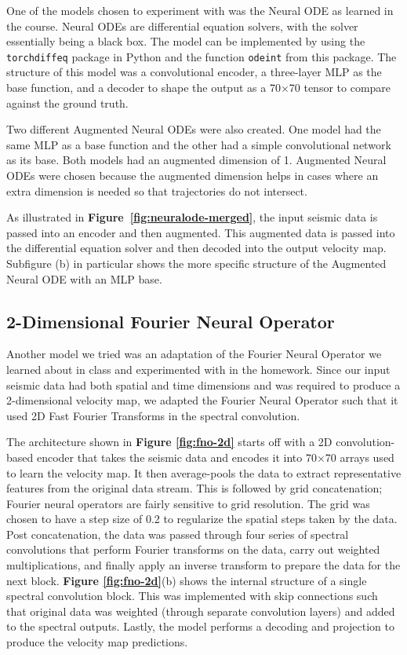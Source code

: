 \documentclass{article}
\begin{document}
One of the models chosen to experiment with was the Neural ODE as learned in the course. Neural ODEs are differential equation solvers, with the solver essentially being a black box. The model can be implemented by using the \texttt{torchdiffeq} package in Python and the function \texttt{odeint} from this package. The structure of this model was a convolutional encoder, a three-layer MLP as the base function, and a decoder to shape the output as a 70×70 tensor to compare against the ground truth. 

Two different Augmented Neural ODEs were also created. One model had the same MLP as a base function and the other had a simple convolutional network as its base. Both models had an augmented dimension of 1. Augmented Neural ODEs were chosen because the augmented dimension helps in cases where an extra dimension is needed so that trajectories do not intersect.

As illustrated in \textbf{Figure~\ref{fig:neuralode-merged}}, the input seismic data is passed into an encoder and then augmented. This augmented data is passed into the differential equation solver and then decoded into the output velocity map. Subfigure (b) in particular shows the more specific structure of the Augmented Neural ODE with an MLP base.


\subsection{2-Dimensional Fourier Neural Operator}

Another model we tried was an adaptation of the Fourier Neural Operator \cite{fno} we learned about in class and experimented with in the homework. Since our input seismic data had both spatial and time dimensions and was required to produce a 2-dimensional velocity map, we adapted the Fourier Neural Operator such that it used 2D Fast Fourier Transforms in the spectral convolution.

The architecture shown in \textbf{Figure \ref{fig:fno-2d}} starts off with a 2D convolution-based encoder that takes the seismic data and encodes it into 70×70 arrays used to learn the velocity map. It then average-pools the data to extract representative features from the original data stream. This is followed by grid concatenation; Fourier neural operators are fairly sensitive to grid resolution. The grid was chosen to have a step size of 0.2 to regularize the spatial steps taken by the data. Post concatenation, the data was passed through four series of spectral convolutions that perform Fourier transforms on the data, carry out weighted multiplications, and finally apply an inverse transform to prepare the data for the next block. \textbf{Figure \ref{fig:fno-2d}}(b) shows the internal structure of a single spectral convolution block. This was implemented with skip connections such that original data was weighted (through separate convolution layers) and added to the spectral outputs. Lastly, the model performs a decoding and projection to produce the velocity map predictions.
\end{document}
